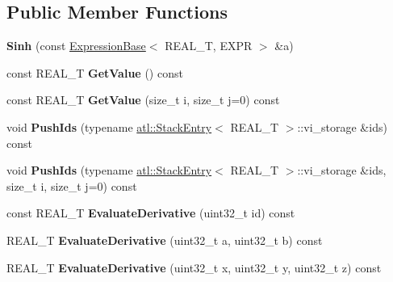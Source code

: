 \subsection*{Public Member Functions}
\begin{DoxyCompactItemize}
\item 
\hypertarget{structatl_1_1_sinh_a384041506888c72dd5b68e81fa6b3943}{{\bfseries Sinh} (const \hyperlink{structatl_1_1_expression_base}{Expression\+Base}$<$ R\+E\+A\+L\+\_\+\+T, E\+X\+P\+R $>$ \&a)}\label{structatl_1_1_sinh_a384041506888c72dd5b68e81fa6b3943}

\item 
\hypertarget{structatl_1_1_sinh_aaf5066d39e86dae3dffa9abe77c9f924}{const R\+E\+A\+L\+\_\+\+T {\bfseries Get\+Value} () const }\label{structatl_1_1_sinh_aaf5066d39e86dae3dffa9abe77c9f924}

\item 
\hypertarget{structatl_1_1_sinh_a7589599a40e29cf02896222ea966e79f}{const R\+E\+A\+L\+\_\+\+T {\bfseries Get\+Value} (size\+\_\+t i, size\+\_\+t j=0) const }\label{structatl_1_1_sinh_a7589599a40e29cf02896222ea966e79f}

\item 
\hypertarget{structatl_1_1_sinh_a12d7cb5fef15afb217a023a5c6c2e05a}{void {\bfseries Push\+Ids} (typename \hyperlink{structatl_1_1_stack_entry}{atl\+::\+Stack\+Entry}$<$ R\+E\+A\+L\+\_\+\+T $>$\+::vi\+\_\+storage \&ids) const }\label{structatl_1_1_sinh_a12d7cb5fef15afb217a023a5c6c2e05a}

\item 
\hypertarget{structatl_1_1_sinh_ae5aaaa1b9a91fa00c9a1804ffd0348bb}{void {\bfseries Push\+Ids} (typename \hyperlink{structatl_1_1_stack_entry}{atl\+::\+Stack\+Entry}$<$ R\+E\+A\+L\+\_\+\+T $>$\+::vi\+\_\+storage \&ids, size\+\_\+t i, size\+\_\+t j=0) const }\label{structatl_1_1_sinh_ae5aaaa1b9a91fa00c9a1804ffd0348bb}

\item 
\hypertarget{structatl_1_1_sinh_ae15758db36d4cf71339418239d204b0e}{const R\+E\+A\+L\+\_\+\+T {\bfseries Evaluate\+Derivative} (uint32\+\_\+t id) const }\label{structatl_1_1_sinh_ae15758db36d4cf71339418239d204b0e}

\item 
\hypertarget{structatl_1_1_sinh_a2306a8e605b8f6a8a9913c97500719e9}{R\+E\+A\+L\+\_\+\+T {\bfseries Evaluate\+Derivative} (uint32\+\_\+t a, uint32\+\_\+t b) const }\label{structatl_1_1_sinh_a2306a8e605b8f6a8a9913c97500719e9}

\item 
\hypertarget{structatl_1_1_sinh_ae3a5b0a478d6ef9dcf8e1d20c8ed3f92}{R\+E\+A\+L\+\_\+\+T {\bfseries Evaluate\+Derivative} (uint32\+\_\+t x, uint32\+\_\+t y, uint32\+\_\+t z) const }\label{structatl_1_1_sinh_ae3a5b0a478d6ef9dcf8e1d20c8ed3f92}


\end{DoxyCompactItemize}
